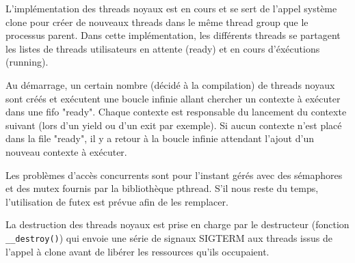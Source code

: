 L'implémentation des threads noyaux est en cours et se sert de l'appel système clone pour créer de nouveaux threads dans le même thread group que le processus parent. Dans cette implémentation, les différents threads se partagent les listes de threads utilisateurs en attente (ready) et en cours d'éxécutions (running).

Au démarrage, un certain nombre (décidé à la compilation) de threads noyaux sont créés et exécutent une boucle infinie allant chercher un contexte à exécuter dans une fifo "ready". Chaque contexte est responsable du lancement du contexte suivant (lors d'un yield ou d'un exit par exemple). Si aucun contexte n'est placé dans la file "ready", il y a retour à la boucle infinie attendant l'ajout d'un nouveau contexte à exécuter.

Les problèmes d'accès concurrents sont pour l'instant gérés avec des sémaphores et des mutex fournis par la bibliothèque pthread. S'il nous reste du temps, l'utilisation de futex est prévue afin de les remplacer.

La destruction des threads noyaux est prise en charge par le destructeur (fonction \verb!__destroy()!) qui envoie une série de signaux SIGTERM aux threads issus de l'appel à clone avant de libérer les ressources qu'ils occupaient.
